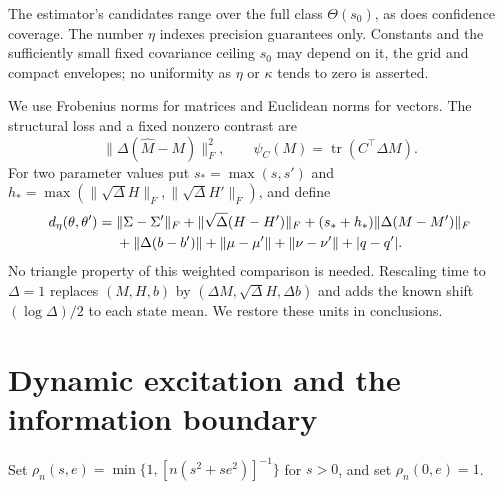 \documentclass[11pt,a4paper]{amsart}
\theoremstyle{plain}
\theoremstyle{definition}
\theoremstyle{remark}
\DeclareMathOperator{\tr}{tr}
\begin{document}
The estimator's candidates range over the full class $\Theta(s_0)$,
as does confidence coverage. The number $\eta$ indexes precision guarantees
only. Constants and the sufficiently small fixed covariance ceiling $s_0$
may depend on it, the grid and compact envelopes; no uniformity as $\eta$
or $\kappa$ tends to zero is asserted.

We use Frobenius norms for matrices and Euclidean norms for vectors. The
structural loss and a fixed nonzero contrast are
\begin{equation}\label{eq:loss}
 \|\Delta(\widehat M-M)\|_F^2,\qquad
 \psi_C(M)=\tr(C^\top\Delta M).
\end{equation}
For two parameter values put
$s_* =\max(s,s')$ and
$h_* =\max(\|\sqrt\Delta H\|_F,\|\sqrt\Delta H'\|_F)$, and define
\begin{align}\label{eq:comparison}
 d_\eta(\theta,\theta')={}&\|\Sigma-\Sigma'\|_F
 +\|\sqrt\Delta(H-H')\|_F
 +(s_*+h_*)\|\Delta(M-M')\|_F\notag\\
 &+\|\Delta(b-b')\|+\|\mu-\mu'\|+\|\nu-\nu'\|+|q-q'|.
\end{align}
No triangle property of this weighted comparison is needed. Rescaling time
to $\Delta=1$ replaces $(M,H,b)$ by
$(\Delta M,\sqrt\Delta H,\Delta b)$ and adds the known shift
$(\log\Delta)/2$ to each state mean. We restore these units in conclusions.

\section{Dynamic excitation and the information boundary}\label{sec:theorem}

Set $\rho_n(s,e)=\min\{1,[n(s^2+se^2)]^{-1}\}$ for $s>0$, and set
$\rho_n(0,e)=1$.
\end{document}
